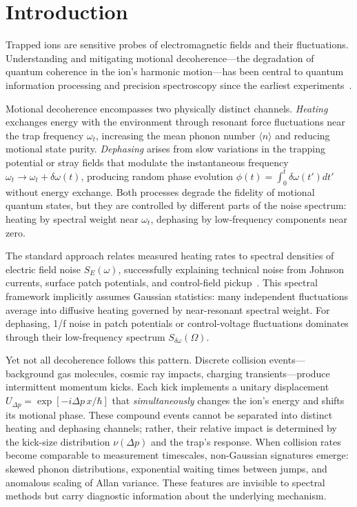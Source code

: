 \section{Introduction}

Trapped ions are sensitive probes of electromagnetic fields and their fluctuations. Understanding and mitigating motional decoherence—the degradation of quantum coherence in the ion's harmonic motion—has been central to quantum information processing and precision spectroscopy since the earliest experiments~\cite{Turchette2000,Wineland1998}. 

Motional decoherence encompasses two physically distinct channels. \emph{Heating} exchanges energy with the environment through resonant force fluctuations near the trap frequency $\omega_t$, increasing the mean phonon number $\langle n \rangle$ and reducing motional state purity. \emph{Dephasing} arises from slow variations in the trapping potential or stray fields that modulate the instantaneous frequency $\omega_t \to \omega_t + \delta\omega(t)$, producing random phase evolution $\phi(t) = \int_0^t \delta\omega(t') dt'$ without energy exchange. Both processes degrade the fidelity of motional quantum states, but they are controlled by different parts of the noise spectrum: heating by spectral weight near $\omega_t$, dephasing by low-frequency components near zero.

The standard approach relates measured heating rates to spectral densities of electric field noise $S_E(\omega)$, successfully explaining technical noise from Johnson currents, surface patch potentials, and control-field pickup~\cite{Brownnutt2015}. This spectral framework implicitly assumes Gaussian statistics: many independent fluctuations average into diffusive heating governed by near-resonant spectral weight. For dephasing, 1/f noise in patch potentials or control-voltage fluctuations dominates through their low-frequency spectrum $S_{\delta\omega}(\Omega)$.

Yet not all decoherence follows this pattern. Discrete collision events—background gas molecules, cosmic ray impacts, charging transients—produce intermittent momentum kicks. Each kick implements a unitary displacement $U_{\Delta p} = \exp[-i \Delta p \, x/\hbar]$ that \emph{simultaneously} changes the ion's energy and shifts its motional phase. These compound events cannot be separated into distinct heating and dephasing channels; rather, their relative impact is determined by the kick-size distribution $\nu(\Delta p)$ and the trap's response. When collision rates become comparable to measurement timescales, non-Gaussian signatures emerge: skewed phonon distributions, exponential waiting times between jumps, and anomalous scaling of Allan variance. These features are invisible to spectral methods but carry diagnostic information about the underlying mechanism.

